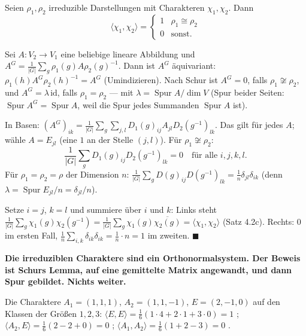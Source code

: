 \begin{merksatz}
Seien $\rho_1, \rho_2$ irreduzible Darstellungen mit Charakteren $\chi_1, \chi_2$. Dann
\[ \langle\chi_1, \chi_2\rangle = \begin{cases}1 & \rho_1\cong\rho_2\\ 0 & \text{sonst.}\end{cases} \]

Sei $A\colon V_2\to V_1$ eine beliebige lineare Abbildung und $A^{G} = \frac1{|G|}\sum_g\rho_1(g)A\rho_2(g)^{-1}$. Dann ist $A^{G}$ äquivariant: $\rho_1(h)A^{G}\rho_2(h)^{-1} = A^{G}$ (Umindizieren). Nach Schur ist $A^{G} = 0$, falls $\rho_1\not\cong\rho_2$, und $A^{G} = \lambda\,\mathrm{id}$, falls $\rho_1 = \rho_2$ --- mit $\lambda = \operatorname{Spur}A/\dim V$ (Spur beider Seiten: $\operatorname{Spur}A^{G} = \operatorname{Spur}A$, weil die Spur jedes Summanden $\operatorname{Spur}A$ ist).

In Basen: $(A^{G})_{ik} = \frac1{|G|}\sum_g\sum_{j,l}D_1(g)_{ij}A_{jl}D_2(g^{-1})_{lk}$. Das gilt für jedes $A$; wähle $A = E_{jl}$ (eine $1$ an der Stelle $(j, l)$). Für $\rho_1\not\cong\rho_2$:
\[ \frac1{|G|}\sum_gD_1(g)_{ij}D_2(g^{-1})_{lk} = 0\quad\text{für alle } i, j, k, l . \]
Für $\rho_1 = \rho_2 = \rho$ der Dimension $n$: $\frac1{|G|}\sum_gD(g)_{ij}D(g^{-1})_{lk} = \frac{1}{n}\delta_{jl}\delta_{ik}$ (denn $\lambda = \operatorname{Spur}E_{jl}/n = \delta_{jl}/n$).

Setze $i = j$, $k = l$ und summiere über $i$ und $k$: Links steht $\frac1{|G|}\sum_g\chi_1(g)\chi_2(g^{-1}) = \frac1{|G|}\sum_g\chi_1(g)\overline{\chi_2(g)} = \langle\chi_1, \chi_2\rangle$ (Satz 4.2c). Rechts: $0$ im ersten Fall, $\frac1n\sum_{i,k}\delta_{ik}\delta_{ik} = \frac1n\cdot n = 1$ im zweiten. $\blacksquare$

\begin{center}
\begin{minipage}{0.9\textwidth}
\textbf{Die irreduziblen Charaktere sind ein Orthonormalsystem. Der Beweis ist Schurs Lemma, auf eine gemittelte Matrix angewandt, und dann Spur gebildet. Nichts weiter.}
\end{minipage}
\end{center}

Die Charaktere $A_1 = (1, 1, 1)$, $A_2 = (1, 1, -1)$, $E = (2, -1, 0)$ auf den Klassen der Größen $1, 2, 3$: $\langle E, E\rangle = \frac16(1\cdot4 + 2\cdot1 + 3\cdot0) = 1$ \checkmark; $\langle A_2, E\rangle = \frac16(2 - 2 + 0) = 0$ \checkmark; $\langle A_1, A_2\rangle = \frac16(1 + 2 - 3) = 0$ \checkmark.


\end{merksatz}
